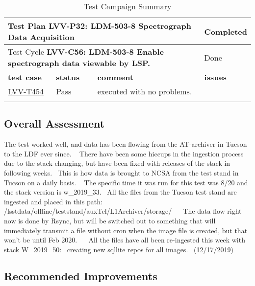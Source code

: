 \documentclass[DM,STR,toc]{lsstdoc}
\begin{document}
\begin{longtable}{p{2cm}p{2.5cm}p{9cm}p{2.5cm}}
\toprule
\multicolumn{3}{l}{ Test Plan {\bf LVV-P32: LDM-503-8 Spectrograph Data Acquisition
 }} & Completed \\\hline

  \multicolumn{3}{l}{ Test Cycle {\bf LVV-C56: LDM-503-8 Enable spectrograph data viewable by LSP.
 }} & Done \\\hline

  {\bf \footnotesize test case} & {\bf \footnotesize status} & {\bf \footnotesize comment} & {\bf \footnotesize issues} \\\toprule

\href{https://jira.lsstcorp.org/secure/Tests.jspa#/testCase/LVV-T454}{LVV-T454}
    & Pass &
    \begin{minipage}[]{9cm}
    \smallskip
    executed with no problems.~

    \medskip
    \end{minipage}
    &
    \\\hline
\caption{Test Campaign Summary}
\label{table:summary}
\end{longtable}

\subsection{Overall Assessment}
\label{sect:overallassessment}

The test worked well, and data has been flowing from the AT-archiver in
Tucson to the LDF ever since. ~ There have been some hiccups in the
ingestion process due to the stack changing, but have been fixed with
releases of the stack in following weeks. ~This is how data is brought
to NCSA from the test stand in Tucson on a daily basis. ~ The specific
time it was run for this test was 8/20 and the stack version is
w\_2019\_33. ~All the files from the Tucson test stand are ingested and
placed in this path:
/lsstdata/offline/teststand/auxTel/L1Archiver/storage/ ~ ~The data flow
right now is done by Rsync, but will be switched out to something that
will immediately transmit a file without cron when the image file is
created, but that won't be until Feb 2020. ~ ~All the files have all
been re-ingested this week with stack W\_2019\_50: ~creating new sqllite
repos for all images. ~(12/17/2019)~


\subsection{Recommended Improvements}
\label{sect:recommendations}
\end{document}
